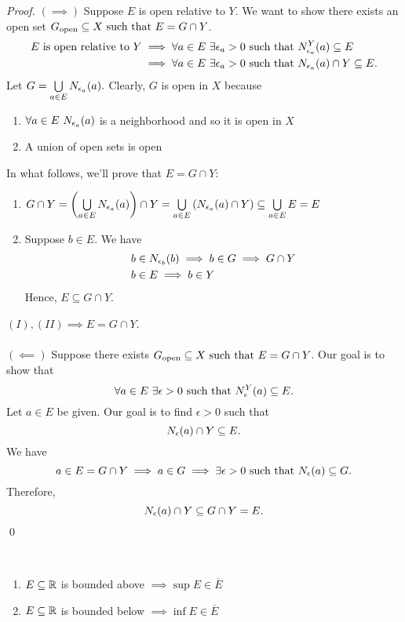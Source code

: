 \begin{proof}
    $(\implies)$ Suppose $E$ is open relative to $Y$. We want to show there exists an open set $G_{\text{open}}\subseteq X \text{ such that } E = G \cap Y$.
    \begin{align*}
        \text{$E$ is open relative to $Y$} &\implies \forall a \in E ~\exists \epsilon_a > 0 \text{ such that } N_{\epsilon_a}^{Y}(a)\subseteq E \\
        &\implies \forall a \in E ~\exists \epsilon_a > 0 \text{ such that } N_{\epsilon_a}(a)\cap Y \subseteq E.
    \end{align*}
    Let $G=\bigcup \limits_{a\in E} N_{\epsilon_a}(a).$ Clearly, $G$ is open in $X$ because
    \begin{enumerate}[$(i)$]
        \item $\forall a \in E ~N_{\epsilon_a}(a)$ is a neighborhood and so it is open in $X$
        \item A union of open sets is open
    \end{enumerate}
    In what follows, we'll prove that $E=G\cap Y:$
    \begin{enumerate}[$(I)$]
        \item $G\cap Y=\left(\bigcup \limits_{a\in E} N_{\epsilon_a}(a)\right) \cap Y = \bigcup \limits_{a\in E} \left(N_{\epsilon_a}(a) \cap Y\right) \subseteq \bigcup \limits_{a\in E} E = E$
        \item Suppose $b\in E$. We have 
        \begin{align*}
            &b\in N_{\epsilon_b}(b) \implies b \in G \implies G \cap Y \\
            &b\in E \implies b \in Y
        \end{align*}
        Hence, $E\subseteq G \cap Y.$
    \end{enumerate}
    $(I),(II) \implies E = G \cap Y$.
    \\ \\
    $(\impliedby)$ Suppose there exists $G_{\text{open}} \subseteq X \text{ such that } E = G \cap Y$. Our goal is to show that 
    $$\forall a \in E ~\exists \epsilon > 0 \text{ such that } N_{\epsilon}^{Y}(a) \subseteq E.$$
    Let $a\in E$ be given. Our goal is to find $\epsilon > 0$ such that
    $$N_{\epsilon}(a)\cap Y \subseteq E.$$
    We have
    $$a\in E = G \cap Y \implies a \in G \implies \exists \epsilon > 0 \text{ such that } N_{\epsilon}(a) \subseteq G.$$
    Therefore,
    $$N_{\epsilon}(a)\cap Y \subseteq G \cap Y = E.$$
    \qed 
\end{proof}

\begin{theorem} \leavevmode \\
    \label{thm2.28}
    \begin{enumerate}[$(i)$]
        \item $E\subseteq \mathbb{R}$ is bounded above $\implies \sup E \in \overline{E}$
        \item $E\subseteq \mathbb{R}$ is bounded below $\implies \inf E \in \overline{E}$
    \end{enumerate}
\end{theorem}

